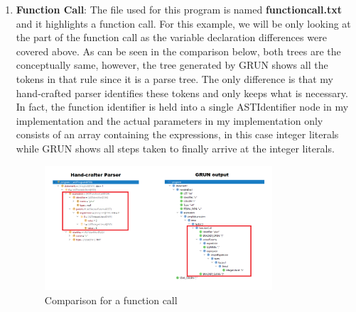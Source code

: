 \documentclass{article}
\begin{document}
\begin{enumerate}
\item \textbf{Function Call}: The file used for this program is named \textbf{functioncall.txt} and it highlights a function call. For this example, we will be only looking at the part of the function call as the variable declaration differences were covered above. As can be seen in the comparison below, both trees are the conceptually same, however, the tree generated by GRUN shows all the tokens in that rule since it is a parse tree. The only difference is that my hand-crafted parser identifies these tokens and only keeps what is necessary.  In fact, the function identifier is held into a single ASTIdentifier node in my implementation and the actual parameters in my implementation only consists of an array containing the expressions, in this case integer literals while GRUN shows all steps taken to finally arrive at the integer literals.
						\begin{figure}[H]
					\centering
			 			\includegraphics[width=0.8\textwidth]{comparefunctioncall.png}
			  			\caption{Comparison for a function call}
			  			\label{fig:comparefunctioncall}
					\end{figure}



\end{enumerate}
\end{document}

